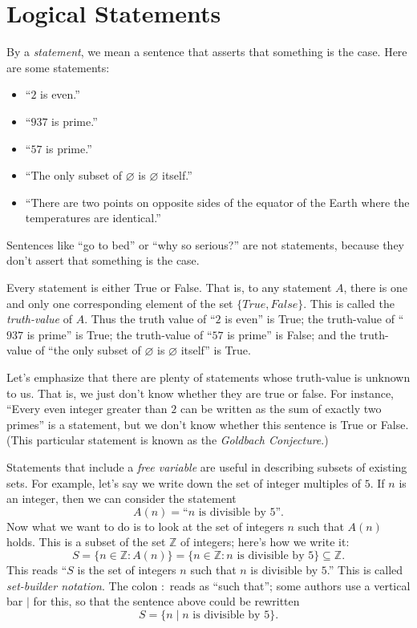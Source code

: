 \documentclass[11pt,dvipsnames]{book}
\numberwithin{figure}{section} %
\numberwithin{table}{section} %
\begin{document}
\section{Logical Statements}%
\label{logicalstatements}

By a \emph{statement}, we mean a sentence that asserts that something is the case.
Here are some statements:
\begin{itemize}
    \item ``$2$ is even.''
    \item ``$937$ is prime.''
    \item ``$57$ is prime.''
    \item ``The only subset of $\varnothing$ is $\varnothing$ itself.''
    \item ``There are two points on opposite sides of the equator of the Earth where the temperatures are identical.''
\end{itemize}
Sentences like ``go to bed'' or ``why so serious?'' are not statements, because they don't assert that something is the case.

Every statement is either True or False.
That is, to any statement $A$, there is one and only one corresponding element of the set $\{True, False\}$.
This is called the \emph{truth-value} of $A$.
Thus the truth value of ``$2$ is even'' is True; the truth-value of ``$937$ is prime'' is True; the truth-value of ``$57$ is prime'' is False; and the truth-value of ``the only subset of $\varnothing$ is $\varnothing$ itself'' is True.

Let's emphasize that there are plenty of statements whose truth-value is unknown to us.
That is, we just don't know whether they are true or false.
For instance, ``Every even integer greater than $2$ can be written as the sum of exactly two primes'' is a statement, but we don't know whether this sentence is True or False.
(This particular statement is known as the \emph{Goldbach Conjecture}.)

Statements that include a \emph{free variable} are useful in describing subsets of existing sets.
For example, let's say we write down the set of integer multiples of $5$.
If $n$ is an integer, then we can consider the statement
\[
    A(n) = \text{``$n$ is divisible by $5$''}.
\]
Now what we want to do is to look at the set of integers $n$ such that $A(n)$ holds.
This is a subset of the set $\mathbb{Z}$ of integers;
here's how we write it:
\[
    S = \{n \in \mathbb{Z} : A(n)\} = \{n \in \mathbb{Z} : n \text{ is divisible by 5}\} \subseteq \mathbb{Z}.
\]
This reads ``$S$ is the set of integers $n$ such that $n$ is divisible by $5$.''
This is called \emph{set-builder notation}.
The colon $:$ reads as ``such that'';
some authors use a vertical bar $|$ for this, so that the sentence above could be rewritten
\[
S=\{n\; |\; n \text{ is divisible by 5}\}.
\]
\end{document}
